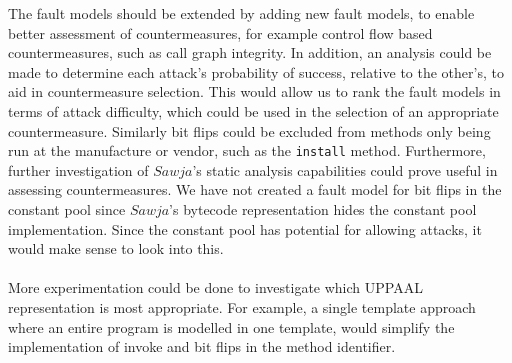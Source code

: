The fault models should be extended by adding new fault models, to enable better assessment of countermeasures, for example control flow based countermeasures, such as call graph integrity. In addition, an analysis could be made to determine each attack's probability of success, relative to the other's, to aid in countermeasure selection. This would allow us to rank the fault models in terms of attack difficulty, which could be used in the selection of an appropriate countermeasure. Similarly bit flips could be excluded from methods only being run at the manufacture or vendor, such as the \texttt{install} method. Furthermore, further investigation of $Sawja$'s static analysis capabilities could prove useful in assessing countermeasures. We have not created a fault model for bit flips in the constant pool since $Sawja$'s bytecode representation hides the constant pool implementation. Since the constant pool has potential for allowing attacks, it would make sense to look into this.\\\\
More experimentation could be done to investigate which UPPAAL representation is most appropriate. For example, a single template approach where an entire program is modelled in one template, would simplify  the implementation of invoke and bit flips in the method identifier.
